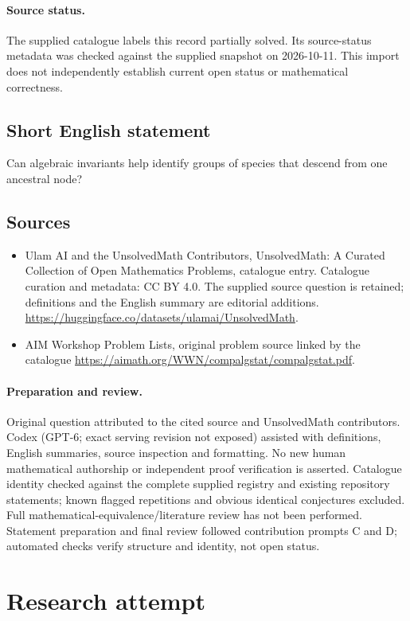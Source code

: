 \documentclass[11pt]{article}
\begin{document}
\paragraph{Source status.}
The supplied catalogue labels this record partially solved. Its source-status metadata was checked against the supplied snapshot on 2026-10-11. This import does not independently establish current open status or mathematical correctness.
\subsection{Short English statement}
Can algebraic invariants help identify groups of species that descend from one ancestral node?
\subsection{Sources}
\begin{itemize}
\item[S1] Ulam AI and the UnsolvedMath Contributors, UnsolvedMath: A Curated Collection of Open Mathematics Problems, catalogue entry. Catalogue curation and metadata: CC BY 4.0. The supplied source question is retained; definitions and the English summary are editorial additions.
\url{https://huggingface.co/datasets/ulamai/UnsolvedMath}.
\item[S2] AIM Workshop Problem Lists, original problem source linked by the catalogue
\url{https://aimath.org/WWN/compalgstat/compalgstat.pdf}.
\end{itemize}
\paragraph{Preparation and review.}
Original question attributed to the cited source and UnsolvedMath contributors. Codex (GPT-6; exact serving revision not exposed) assisted with definitions, English summaries, source inspection and formatting. No new human mathematical authorship or independent proof verification is asserted. Catalogue identity checked against the complete supplied registry and existing repository statements; known flagged repetitions and obvious identical conjectures excluded. Full mathematical-equivalence/literature review has not been performed. Statement preparation and final review followed contribution prompts C and D; automated checks verify structure and identity, not open status.
\label{end:statement}


\section{Research attempt}
\end{document}
